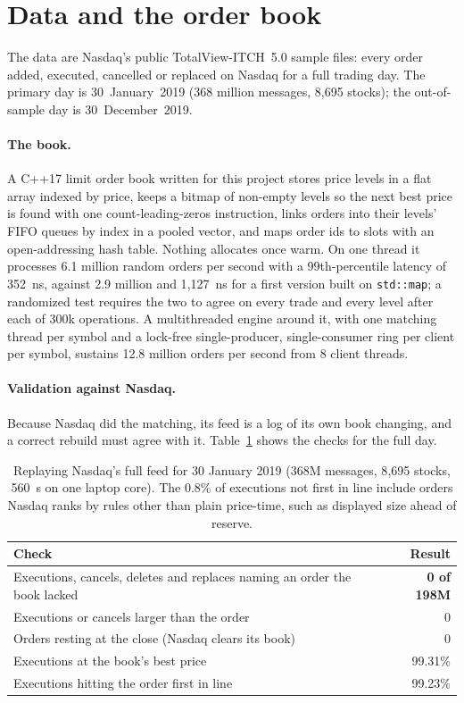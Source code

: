 \documentclass[11pt]{article}
\begin{document}
\section{Data and the order book}\label{sec:data}
The data are Nasdaq's public TotalView-ITCH~5.0 sample files: every order added, executed, cancelled or replaced on Nasdaq for a full trading day. The primary day is 30~January~2019 (368 million messages, 8{,}695 stocks); the out-of-sample day is 30~December~2019.

\paragraph{The book.} A C++17 limit order book written for this project stores price levels in a flat array indexed by price, keeps a bitmap of non-empty levels so the next best price is found with one count-leading-zeros instruction, links orders into their levels' FIFO queues by index in a pooled vector, and maps order ids to slots with an open-addressing hash table. Nothing allocates once warm. On one thread it processes 6.1 million random orders per second with a 99th-percentile latency of 352~ns, against 2.9 million and 1{,}127~ns for a first version built on \texttt{std::map}; a randomized test requires the two to agree on every trade and every level after each of 300k operations. A multithreaded engine around it, with one matching thread per symbol and a lock-free single-producer, single-consumer ring per client per symbol, sustains 12.8 million orders per second from 8 client threads.

\paragraph{Validation against Nasdaq.} Because Nasdaq did the matching, its feed is a log of its own book changing, and a correct rebuild must agree with it. Table~\ref{tab:replay} shows the checks for the full day.

\begin{table}[h]
\centering\small
\begin{tabular}{lr}
\toprule
Check & Result \\
\midrule
Executions, cancels, deletes and replaces naming an order the book lacked & \textbf{0 of 198M} \\
Executions or cancels larger than the order & 0 \\
Orders resting at the close (Nasdaq clears its book) & 0 \\
Executions at the book's best price & 99.31\% \\
Executions hitting the order first in line & 99.23\% \\
\bottomrule
\end{tabular}
\caption{Replaying Nasdaq's full feed for 30 January 2019 (368M messages, 8{,}695 stocks, 560~s on one laptop core). The 0.8\% of executions not first in line include orders Nasdaq ranks by rules other than plain price-time, such as displayed size ahead of reserve.}
\label{tab:replay}
\end{table}
\end{document}
